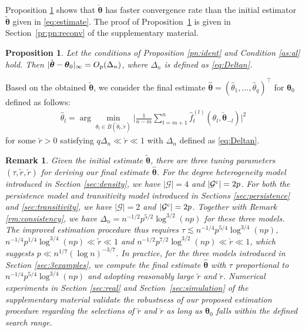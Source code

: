 \documentclass[12pt]{article}
\newtheorem{proposition}{Proposition}
\newtheorem{remark}{Remark}
\newcommand{\btheta}{\boldsymbol \theta}
\def\T{{\scriptscriptstyle \top} }
\newcommand{\btc}{{\rm c}}
\newcommand{\0}{{\bf 0}}
\begin{document}
 Proposition \ref{pn:reconv} shows that $\check{\btheta}$ has faster convergence rate than the initial estimator $\tilde{\btheta}$ given in \eqref{eq:estimate}.  The proof of Proposition~\ref{pn:reconv}
is given in Section~\ref{pr:pn:reconv} of the supplementary material.
\begin{proposition}\label{pn:reconv}
Let the conditions of Proposition {\rm\ref{pn:ident}} and Condition {\rm\ref{as:al}} hold. Then
$|\check{\btheta}-\btheta_{0}|_\infty=O_{\rm p}(\Delta_n)$, where $\Delta_n$ is defined as \eqref{eq:Deltan}.
\end{proposition}


Based on the obtained $\check{\btheta}$, we consider the final estimate $\hat{\btheta}=(\hat{\theta}_1,\ldots,\hat{\theta}_q)^{\T}$ for $\btheta_0$ defined as follows:
\begin{align}\label{eq:thetal}
\hat{\theta}_l=\arg\min_{\theta_l\in B(\check{\theta}_l,\check{r})}\bigg|\frac{1}{n-m}\sum_{t=m+1}^n\hat{f}_t^{(l)}(\theta_l,\check{\btheta}_{-l})\bigg|^2
\end{align}
for some $\check{r}>0$ satisfying $q\Delta_n\ll \check{r}\ll 1$ with $\Delta_n$ defined as \eqref{eq:Deltan}.

\begin{remark} 
Given the initial estimate $\tilde{\btheta}$, there are three tuning parameters $(\tau,\tilde{r},\check{r})$ for deriving our final estimate $\hat{\btheta}$. 
For the degree heterogeneity model introduced in Section {\rm\ref{sec:density}}, we have $|\mathcal{G}| = 4$ and $|\mathcal{G}^\btc| = 2p$. For both the persistence model and transitivity model introduced in Sections {\rm\ref{sec:persistence}} and {\rm\ref{sec:transitivity}}, we have $|\mathcal{G}| = 2$ and $|\mathcal{G}^\btc| = 2p$.  Together with Remark {\rm\ref{rm:consistency}}, we have $\Delta_n = n^{-1/2}p^{5/2}\log^{3/2}(np)$ for these three models. The improved estimation procedure thus requires $\tau\lesssim n^{-1/4}p^{5/4}\log^{3/4}(np)$, $n^{-1/4}p^{1/4}\log^{3/4}(np)\ll \tilde{r}\ll 1$ and $n^{-1/2}p^{7/2}\log^{3/2}(np)\ll \check{r}\ll 1$, which suggests $p\ll n^{1/7}(\log n)^{-3/7}$.
In practice, for the three models introduced in Section {\rm\ref{sec:3examples}}, we compute the final estimate $\hat{\btheta}$ with $\tau$ proportional to $n^{-1/4}p^{5/4}\log^{3/4}(np)$ and adopting reasonably large $\tilde{r}$ and $ \check{r}$. Numerical experiments in Section {\rm\ref{sec:real}}  and Section~{\rm\ref{sec:simulation}} of the supplementary material validate the robustness of our proposed estimation procedure regarding the selections of $\tilde{r}$ and $\check{r}$ as long as $\btheta_0$ falls within the defined search range.

\end{remark}
\end{document}
